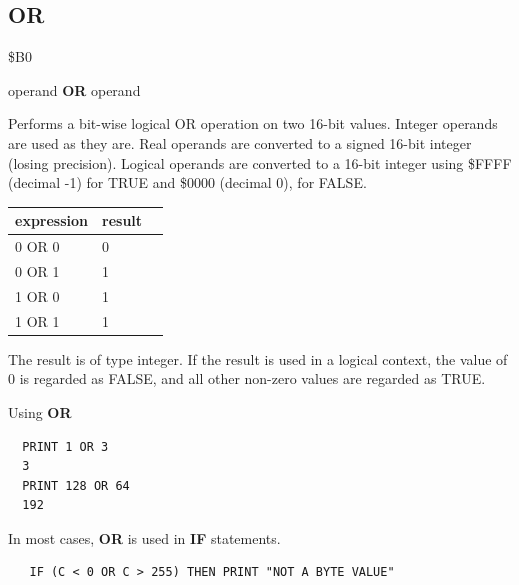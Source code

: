 \subsection{OR}
\begin{description}[leftmargin=2cm,style=nextline]
\item [Token:] \$B0
\item [Format:] operand {\bf OR} operand
\item [Usage:]  Performs a bit-wise
                logical OR operation on two 16-bit values.
                Integer operands are used as they are.
                Real operands are converted to a signed 16-bit integer (losing precision).
                Logical operands are converted to a 16-bit integer
                using \$FFFF (decimal -1) for TRUE
                and \$0000 (decimal 0), for FALSE.

\begin{center}
{\ttfamily
\setlength{\tabcolsep}{1mm}
    \begin{tabular}{|l|l|l|}
        \hline
            expression & result  \\
        \hline
            0 OR 0  &  0 \\
            0 OR 1  &  1 \\
            1 OR 0  &  1 \\
            1 OR 1  &  1 \\
        \hline
    \end{tabular}
}
\end{center}


\item [Remarks:] The result is of type integer.
                 If the result is used in a logical context,
                 the value of 0 is regarded as FALSE, and
                 all other non-zero values are regarded as TRUE.
\item [Example:] Using {\bf OR}

\begin{tcolorbox}[colback=black,coltext=white]
\verbatimfont{\codefont}
\begin{verbatim}
  PRINT 1 OR 3
  3
  PRINT 128 OR 64
  192
\end{verbatim}
\end{tcolorbox}

In most cases, {\bf OR} is used in {\bf IF} statements.

\begin{tcolorbox}[colback=black,coltext=white]
\verbatimfont{\codefont}
\begin{verbatim}
   IF (C < 0 OR C > 255) THEN PRINT "NOT A BYTE VALUE"
\end{verbatim}
\end{tcolorbox}
\end{description}

